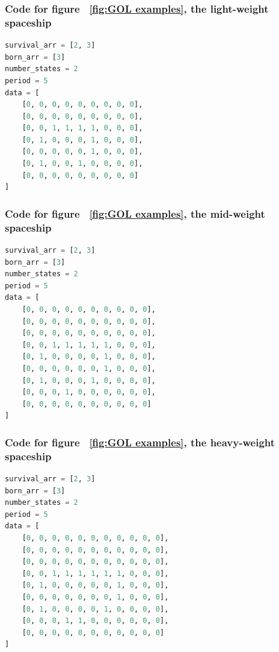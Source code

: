 \documentclass[12pt]{article}
\numberwithin{figure}{section} %
\begin{document}
\subsubsection{Code for figure ~\ref{fig:GOL examples}, the light-weight spaceship}
\label{subsubsection:light-weight spaceship}
\begin{lstlisting}[language = Python]
survival_arr = [2, 3]
born_arr = [3]
number_states = 2
period = 5
data = [
    [0, 0, 0, 0, 0, 0, 0, 0, 0], 
    [0, 0, 0, 0, 0, 0, 0, 0, 0], 
    [0, 0, 1, 1, 1, 1, 0, 0, 0], 
    [0, 1, 0, 0, 0, 1, 0, 0, 0], 
    [0, 0, 0, 0, 0, 1, 0, 0, 0], 
    [0, 1, 0, 0, 1, 0, 0, 0, 0], 
    [0, 0, 0, 0, 0, 0, 0, 0, 0]
]
\end{lstlisting}

\subsubsection{Code for figure ~\ref{fig:GOL examples}, the mid-weight spaceship}
\label{subsubsection:mid-weight spaceship}
\begin{lstlisting}[language = Python]
survival_arr = [2, 3]
born_arr = [3]
number_states = 2
period = 5
data = [
    [0, 0, 0, 0, 0, 0, 0, 0, 0, 0],
    [0, 0, 0, 0, 0, 0, 0, 0, 0, 0],
    [0, 0, 0, 0, 0, 0, 0, 0, 0, 0],
    [0, 0, 1, 1, 1, 1, 1, 0, 0, 0],
    [0, 1, 0, 0, 0, 0, 1, 0, 0, 0],
    [0, 0, 0, 0, 0, 0, 1, 0, 0, 0],
    [0, 1, 0, 0, 0, 1, 0, 0, 0, 0],
    [0, 0, 0, 1, 0, 0, 0, 0, 0, 0],
    [0, 0, 0, 0, 0, 0, 0, 0, 0, 0]
]
\end{lstlisting}

\subsubsection{Code for figure ~\ref{fig:GOL examples}, the heavy-weight spaceship}
\label{subsubsection:heavy-weight spaceship}
\begin{lstlisting}[language = Python]
survival_arr = [2, 3]
born_arr = [3]
number_states = 2
period = 5
data = [
    [0, 0, 0, 0, 0, 0, 0, 0, 0, 0, 0],
    [0, 0, 0, 0, 0, 0, 0, 0, 0, 0, 0],
    [0, 0, 0, 0, 0, 0, 0, 0, 0, 0, 0],
    [0, 0, 1, 1, 1, 1, 1, 1, 0, 0, 0],
    [0, 1, 0, 0, 0, 0, 0, 1, 0, 0, 0],
    [0, 0, 0, 0, 0, 0, 0, 1, 0, 0, 0],
    [0, 1, 0, 0, 0, 0, 1, 0, 0, 0, 0],
    [0, 0, 0, 1, 1, 0, 0, 0, 0, 0, 0],
    [0, 0, 0, 0, 0, 0, 0, 0, 0, 0, 0]
]
\end{lstlisting}
\end{document}
